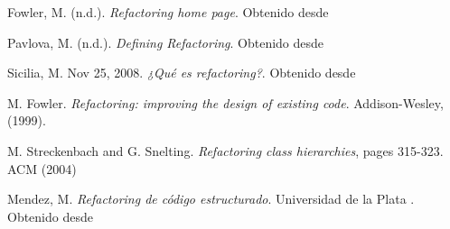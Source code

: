 \documentclass{article}
\begin{document}
\begin{compactitem}
\item Fowler, M. (n.d.). \textit{Refactoring home page}. Obtenido desde 
\item Pavlova, M. (n.d.). \textit{Defining Refactoring}. Obtenido desde 
\item Sicilia, M. Nov 25, 2008. \textit{¿Qué es refactoring?}. Obtenido desde 
\item M. Fowler. \textit{Refactoring: improving the design of existing code}. Addison-Wesley,(1999).
\item M. Streckenbach and G. Snelting. \textit{Refactoring class hierarchies}, pages 315-323. ACM (2004)
\item Mendez, M. \textit{Refactoring de código estructurado}. Universidad de la Plata . \newline{}
  Obtenido desde 
\end{compactitem}
\end{document}
